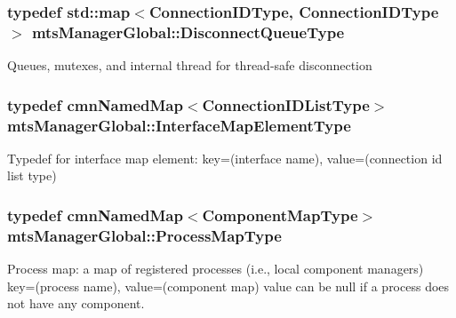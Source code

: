 \hypertarget{classmts_manager_global_a2513c197a42becaff9d23272f4a7be4b}{
\subsubsection[{Disconnect\-Queue\-Type}]{\setlength{\rightskip}{0pt plus 5cm}typedef std\-::map$<${\bf Connection\-I\-D\-Type}, {\bf Connection\-I\-D\-Type}$>$ {\bf mts\-Manager\-Global\-::\-Disconnect\-Queue\-Type}\hspace{0.3cm}{\ttfamily [protected]}}}\label{classmts_manager_global_a2513c197a42becaff9d23272f4a7be4b}
Queues, mutexes, and internal thread for thread-\/safe disconnection \hypertarget{classmts_manager_global_a3449158e2432ced5a21d4853a2ca59b6}{
\subsubsection[{Interface\-Map\-Element\-Type}]{\setlength{\rightskip}{0pt plus 5cm}typedef {\bf cmn\-Named\-Map}$<${\bf Connection\-I\-D\-List\-Type}$>$ {\bf mts\-Manager\-Global\-::\-Interface\-Map\-Element\-Type}\hspace{0.3cm}{\ttfamily [protected]}}}\label{classmts_manager_global_a3449158e2432ced5a21d4853a2ca59b6}
Typedef for interface map element\-: key=(interface name), value=(connection id list type) \hypertarget{classmts_manager_global_ab0257cb91cc9d4c59cf85706f65da9f1}{
\subsubsection[{Process\-Map\-Type}]{\setlength{\rightskip}{0pt plus 5cm}typedef {\bf cmn\-Named\-Map}$<${\bf Component\-Map\-Type}$>$ {\bf mts\-Manager\-Global\-::\-Process\-Map\-Type}\hspace{0.3cm}{\ttfamily [protected]}}}\label{classmts_manager_global_ab0257cb91cc9d4c59cf85706f65da9f1}
Process map\-: a map of registered processes (i.\-e., local component managers) key=(process name), value=(component map) value can be null if a process does not have any component. 

